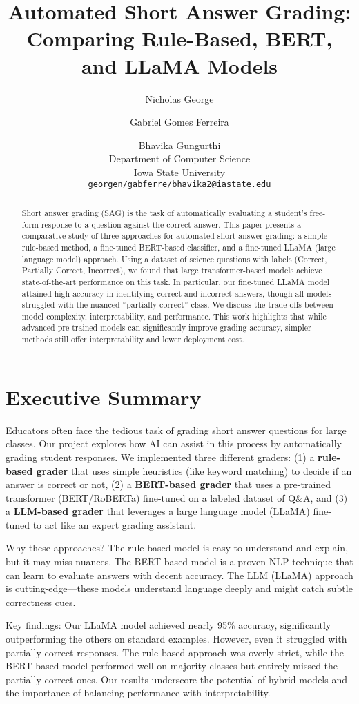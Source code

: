 \documentclass[11pt]{article}
\title{Automated Short Answer Grading: Comparing Rule-Based, BERT, and LLaMA Models}
\author{Nicholas George \and Gabriel Gomes Ferreira \and Bhavika Gungurthi\\
  Department of Computer Science \\ Iowa State University \\ 
  \texttt{georgen/gabferre/bhavika2@iastate.edu}}
\date{}
\begin{document}
\maketitle

\begin{abstract}
Short answer grading (SAG) is the task of automatically evaluating a student's free-form response to a question against the correct answer. This paper presents a comparative study of three approaches for automated short-answer grading: a simple rule-based method, a fine-tuned BERT-based classifier, and a fine-tuned LLaMA (large language model) approach. Using a dataset of science questions with labels (Correct, Partially Correct, Incorrect), we found that large transformer-based models achieve state-of-the-art performance on this task. In particular, our fine-tuned LLaMA model attained high accuracy in identifying correct and incorrect answers, though all models struggled with the nuanced “partially correct” class. We discuss the trade-offs between model complexity, interpretability, and performance. This work highlights that while advanced pre-trained models can significantly improve grading accuracy, simpler methods still offer interpretability and lower deployment cost.
\end{abstract}

\section*{Executive Summary}
Educators often face the tedious task of grading short answer questions for large classes. Our project explores how AI can assist in this process by automatically grading student responses. We implemented three different graders: 
(1) a \textbf{rule-based grader} that uses simple heuristics (like keyword matching) to decide if an answer is correct or not, 
(2) a \textbf{BERT-based grader} that uses a pre-trained transformer (BERT/RoBERTa) fine-tuned on a labeled dataset of Q\&A, and 
(3) a \textbf{LLM-based grader} that leverages a large language model (LLaMA) fine-tuned to act like an expert grading assistant.

Why these approaches? The rule-based model is easy to understand and explain, but it may miss nuances. The BERT-based model is a proven NLP technique that can learn to evaluate answers with decent accuracy. The LLM (LLaMA) approach is cutting-edge—these models understand language deeply and might catch subtle correctness cues.

Key findings: Our LLaMA model achieved nearly 95\% accuracy, significantly outperforming the others on standard examples. However, even it struggled with partially correct responses. The rule-based approach was overly strict, while the BERT-based model performed well on majority classes but entirely missed the partially correct ones. Our results underscore the potential of hybrid models and the importance of balancing performance with interpretability.
\end{document}
